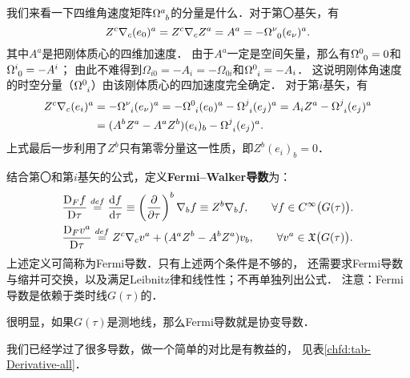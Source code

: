 我们来看一下四维角速度矩阵$\Omega^a_{\hphantom{a} b}$的分量是什么．对于第〇基矢，有
\begin{equation}\label{chfd:eqn_tmp-DZ0}
    Z^c \nabla_c (e_0)^a =Z^c \nabla_c Z^a= A^a =- \Omega^{\nu}_{\hphantom{\nu} 0} (e_\nu)^a .
\end{equation}
其中$A^a$是把刚体质心的四维加速度．
由于$A^a$一定是空间矢量，那么有$\Omega^{0}_{\hphantom{0} 0}=0$和$\Omega^{i}_{\hphantom{i} 0}=-A^i$；
由此不难得到$\Omega_{i0}=-A_i=-\Omega_{0i}$和$\Omega^{0}_{\hphantom{0} i}=-A_i$．
这说明刚体角速度的时空分量（$\Omega^{0}_{\hphantom{0} i}$）由该刚体质心的四加速度完全确定．
对于第$i$基矢，有
\begin{equation} \label{chfd:eqn_tmp-Dei}
\begin{aligned}
    Z^c \nabla_c (e_i)^a &= -\Omega^{\nu}_{\hphantom{\nu} i} (e_\nu)^a
    =-\Omega^{0}_{\hphantom{0} i} (e_0)^a -\Omega^{j}_{\hphantom{j} i} (e_j)^a
    =A_i Z^a -\Omega^{j}_{\hphantom{j} i} (e_j)^a  \\
    &=(A^b Z^a - A^a Z^b) (e_i)_b-\Omega^{j}_{\hphantom{j} i} (e_j)^a  .
\end{aligned}
\end{equation}
上式最后一步利用了$Z^b$只有第零分量这一性质，即$Z^b(e_i)_b=0$．

结合第〇和第$i$基矢的公式，定义{\bfseries \heiti Fermi--Walker导数}为：
\begin{align}
    &\frac{{\rm D}_F f}{{\rm D}\tau} \overset{def}{=} \frac{{\rm d} f}{{\rm d}\tau}
      \equiv\left(\frac{\partial}{\partial \tau}\right)^b \nabla_b f
      \equiv Z^b \nabla_b f,
      \qquad \forall f\in C^\infty\bigl(G(\tau)\bigr). \label{chfd:eqn_fermi-walker-fun} \\
    &\frac{{\rm D}_F v^a}{{\rm D}\tau} \overset{def}{=}
      Z^c \nabla_c v^a +(A^a Z^b-A^b Z^a) v_b ,\qquad
       \forall v^a\in \mathfrak{X}\bigl(G(\tau)\bigr). \label{chfd:eqn_fermi-walker-vec}
\end{align}
上述定义可简称为Fermi导数．只有上述两个条件是不够的，
还需要求Fermi导数与缩并可交换，以及满足Leibnitz律和线性性；不再单独列出公式．
注意：Fermi导数是依赖于类时线$G(\tau)$的．

很明显，如果$G(\tau)$是测地线，那么Fermi导数就是协变导数．

我们已经学过了很多导数，做一个简单的对比是有教益的，
见表\ref{chfd:tab-Derivative-all}．

